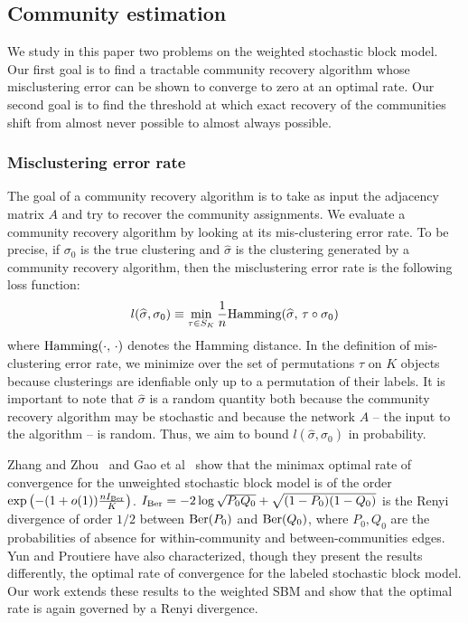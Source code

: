 \subsection{Community estimation}

We study in this paper two problems on the weighted stochastic block model. Our first goal is to find a tractable community recovery algorithm whose misclustering error can be shown to converge to zero at an optimal rate. Our second goal is to find the threshold at which exact recovery of the communities shift from almost never possible to almost always possible. 

\subsubsection{Misclustering error rate}

The goal of a community recovery algorithm is to take as input the adjacency matrix $A$ and try to recover the community assignments. We evaluate a community recovery algorithm by looking at its mis-clustering error rate. To be precise, if $\sigma_0$ is the true clustering and $\hat{\sigma}$ is the clustering generated by a community recovery algorithm, then the misclustering error rate is the following loss function:
\[
l(\widehat{\sigma}, \sigma_0) \equiv \min_{\tau \in S_K} \frac{1}{n} \textrm{Hamming}(\widehat{\sigma},\, \tau \circ \sigma_0 )
\]
where $\textrm{Hamming}(\cdot, \, \cdot)$ denotes the Hamming distance. In the definition of mis-clustering error rate, we minimize over the set of permutations $\tau$ on $K$ objects because clusterings are idenfiable only up to a permutation of their labels. It is important to note that $\hat{\sigma}$ is a random quantity both because the community recovery algorithm may be stochastic and because the network $A$ -- the input to the algorithm -- is random. Thus, we aim to bound $l(\hat{\sigma}, \sigma_0)$ in probability. 

Zhang and Zhou~\cite{zhangminimax} and Gao et al~\cite{gao2015achieving} show that the minimax optimal rate of convergence for the unweighted stochastic block model is of the order $\exp\left( - (1 + o(1)) \frac{n I_{\textrm{Ber}}}{K} \right)$. $I_{\textrm{Ber}} = -2 \log \sqrt{P_0 Q_0} + \sqrt{(1-P_0)(1-Q_0)}$ is the Renyi divergence of order $1/2$ between $\textrm{Ber}(P_0)$ and $\textrm{Ber}(Q_0)$, where $P_0, Q_0$ are the probabilities of absence for within-community and between-communities edges. Yun and Proutiere have also characterized, though they present the results differently, the optimal rate of convergence for the labeled stochastic block model. Our work extends these results to the weighted SBM and show that the optimal rate is again governed by a Renyi divergence.

